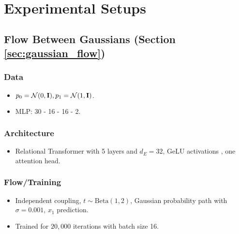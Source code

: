 
\chapter{Experimental Setups}\label{appendix:experimental_setups}

\section*{Flow Between Gaussians (Section \ref{sec:gaussian_flow})}

\subsection*{Data}

\begin{itemize}
    \item $p_0 = \mathcal{N}(0, \mathbf{I}), p_1 = \mathcal{N}(1, \mathbf{I})$. 
    \item MLP: 30 - 16 - 16 - 2.
\end{itemize}

\subsection*{Architecture}
\begin{itemize}
    \item Relational Transformer \citep{diaoRelationalAttentionGeneralizing2023,kofinasGraphNeuralNetworks2024} with 5 layers and $d_E = 32$, GeLU activations \citep{hendrycksGaussianErrorLinear2023a}, one attention head. 
\end{itemize}

\subsection*{Flow/Training}
\begin{itemize}
    \item Independent coupling, $t \sim \text{Beta}(1, 2)$, Gaussian probability path with $\sigma = 0.001$, $x_1$ prediction.
    \item Trained for $20,000$ iterations with batch size 16. 
\end{itemize}

